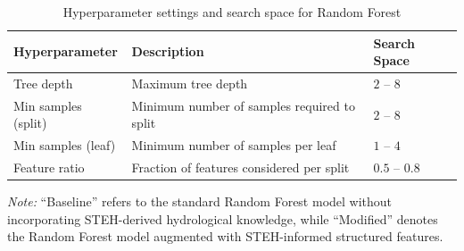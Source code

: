 \documentclass[11pt]{article}
\begin{document}
\begin{table}[htbp]
    \centering
    \caption{Hyperparameter settings and search space for Random Forest}
    \label{tab:rf_hyperparameters}
    \begin{tabular*}{\textwidth}{@{\extracolsep{\fill}}lll}
        \toprule
        \textbf{Hyperparameter} & \textbf{Description} & \textbf{Search Space} \\
        \midrule
        Tree depth & Maximum tree depth & $2$ -- $8$ \\
        Min samples (split) & Minimum number of samples required to split & $2$ -- $8$ \\
        Min samples (leaf) & Minimum number of samples per leaf & $1$ -- $4$ \\
        Feature ratio & Fraction of features considered per split & $0.5$ -- $0.8$ \\
        \bottomrule
    \end{tabular*}

    \vspace{2mm}
    \footnotesize
    \textit{Note:} ``Baseline'' refers to the standard Random Forest model without incorporating STEH-derived hydrological knowledge, while ``Modified'' denotes the Random Forest model augmented with STEH-informed structured features.
\end{table}



\end{document}
